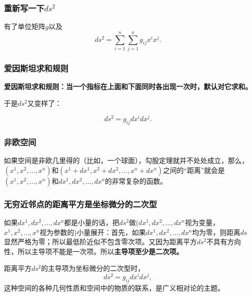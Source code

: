 \begin{frame}
  \frametitle{重新写一下$ds^2$}
  有了单位矩阵$g$以及
  $$ds^2 = \sum_{i=1}^n\sum_{j=1}^n g_{ij} x^i x^j .$$
\end{frame}


\begin{frame}
  \frametitle{爱因斯坦求和规则}
  {\bf 爱因斯坦求和规则：当一个指标在上面和下面同时各出现一次时，默认对它求和。}
             
  于是$ds^2$又变样了：

  $$ds^2=g_{ij}dx^idx^j.$$

\end{frame}


\begin{frame}
  \frametitle{非欧空间}
  如果空间是非欧几里得的（比如，一个球面），勾股定理就并不处处成立，那么，$(x^1,x^2,\ldots,x^n)$和$(x^1+dx^1, x^2+dx^2,\ldots, x^n+dx^n)$之间的``距离''就会是$(x^1,x^2,\ldots,x^n)$和$dx^1,dx^2,\ldots, dx^n$的非常复杂的函数。

\end{frame}

\begin{frame}
  \frametitle{无穷近邻点的距离平方是坐标微分的二次型}
  如果$dx^1, dx^2,\ldots,dx^n$都是小量的话，把$ds^2$做($dx^1, dx^2, \ldots, dx^n$视为变量，$x^1,x^2,\ldots,x^n$视为参数的)小量展开：首先，如果$dx^1,dx^2,\ldots,dx^n$均为零，则距离$ds$显然严格为零；所以最低阶近似不包含零次项。又因为距离平方$ds^2$不具有方向性，所以主导项不能是一次项。所以{\bf 主导项至少是二次项。}

  \skipline

  距离平方$ds^2$的主导项为坐标微分的二次型时，
  $$ ds^2 = g_{ij}dx^idx^j,$$
  这种空间的各种几何性质和空间中的物质的联系，是广义相对论的主题。
\end{frame}

